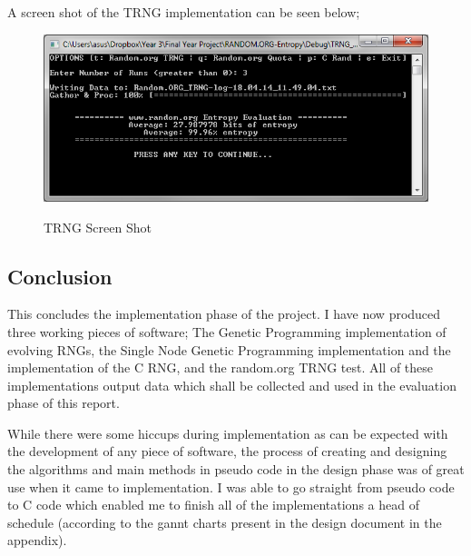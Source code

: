 \documentclass[a4paper,10.5pt]{article}
\begin{document}
A screen shot of the TRNG implementation can be seen below;

\begin{figure}[H]
\centering
\caption{TRNG Screen Shot}
\includegraphics[scale = 0.75]{trng-ss.png}
\label{sngpss}
\end{figure}


\subsection{Conclusion}
This concludes the implementation phase of the project. I have now produced three working pieces of software; The Genetic Programming implementation of evolving RNGs, the Single Node Genetic Programming implementation and the implementation of the C RNG, and the random.org TRNG test. All of these implementations output data which shall be collected and used in the evaluation phase of this report.

While there were some hiccups during implementation as can be expected with the development of any piece of software, the process of creating and designing the algorithms and main methods in pseudo code in the design phase was of great use when it came to implementation. I was able to go straight from pseudo code to C code which enabled me to finish all of the implementations a head of schedule (according to the gannt charts present in the design document in the appendix).
\end{document}
